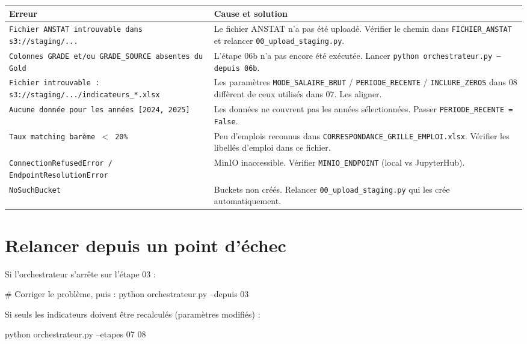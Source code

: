 \documentclass[12pt,a4paper,french]{report}
\begin{document}
\begin{tabularx}{\textwidth}{lX}
  \toprule
  \textbf{Erreur} & \textbf{Cause et solution} \\
  \midrule
  \texttt{Fichier ANSTAT introuvable dans s3://staging/...} &
    Le fichier ANSTAT n'a pas été uploadé. Vérifier le chemin dans
    \texttt{FICHIER\_ANSTAT} et relancer \texttt{00\_upload\_staging.py}. \\
  \texttt{Colonnes GRADE et/ou GRADE\_SOURCE absentes du Gold} &
    L'étape 06b n'a pas encore été exécutée.
    Lancer \texttt{python orchestrateur.py --depuis 06b}. \\
  \texttt{Fichier introuvable : s3://staging/.../indicateurs\_*.xlsx} &
    Les paramètres \texttt{MODE\_SALAIRE\_BRUT} / \texttt{PERIODE\_RECENTE} /
    \texttt{INCLURE\_ZEROS} dans 08 diffèrent de ceux utilisés dans 07.
    Les aligner. \\
  \texttt{Aucune donnée pour les années [2024, 2025]} &
    Les données ne couvrent pas les années sélectionnées.
    Passer \texttt{PERIODE\_RECENTE = False}. \\
  \texttt{Taux matching barème $<$ 20\%} &
    Peu d'emplois reconnus dans \texttt{CORRESPONDANCE\_GRILLE\_EMPLOI.xlsx}.
    Vérifier les libellés d'emploi dans ce fichier. \\
  \texttt{ConnectionRefusedError / EndpointResolutionError} &
    MinIO inaccessible. Vérifier \texttt{MINIO\_ENDPOINT} (local vs JupyterHub). \\
  \texttt{NoSuchBucket} &
    Buckets non créés. Relancer \texttt{00\_upload\_staging.py} qui les crée
    automatiquement. \\
  \bottomrule
\end{tabularx}

\section{Relancer depuis un point d'échec}

Si l'orchestrateur s'arrête sur l'étape 03 :
\begin{codebox}[]
# Corriger le problème, puis :
python orchestrateur.py --depuis 03
\end{codebox}

Si seuls les indicateurs doivent être recalculés (paramètres modifiés) :
\begin{codebox}[]
python orchestrateur.py --etapes 07 08
\end{codebox}

\end{document}
